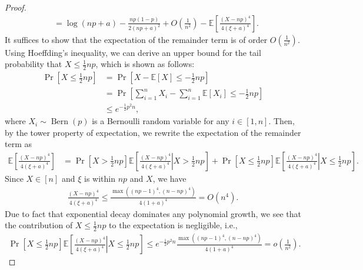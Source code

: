 \documentclass[10pt,a4paper]{amsart}
\DeclareMathOperator{\Bernoulli}{Bern}
\newcommand{\EE}{{\mathbb{E}}}
\begin{document}
\begin{proof}
\begin{equation}
\begin{aligned}
				&= \log (np + a) - \frac{np (1 - p)}{2 (np + a)^2} + O\left( \frac{1}{n^2} \right) - \EE \left[ \frac{(X - np)^4}{4 (\xi + a)^4} \right].
			\end{aligned}
		\end{equation}
		It suffices to show that the expectation of the remainder term is of order $O(\frac{1}{n^2})$. Using Hoeffding's inequality, we can derive an upper bound for the tail probability that $X \leq \frac{1}{2} np$, which is shown as follows:
		\begin{equation}
			\begin{aligned}
				\Pr\left[ X \leq \frac{1}{2} np \right] &= \Pr\left[ X - \EE \left[ X \right] \leq -\frac{1}{2} np \right] \\
				&= \Pr\left[\sum_{i=1}^{n} X_i - \sum_{i=1}^{n} \EE \left[ X_i \right] \leq - \frac{1}{2} np \right] \\
				&\leq e^{-\frac{1}{2} p^2 n},
			\end{aligned}
		\end{equation}
		where $X_i \sim \Bernoulli(p)$ is a Bernoulli random variable for any $i \in [1, n]$. Then, by the tower property of expectation, we rewrite the expectation of the remainder term as
		\begin{equation}
			\begin{aligned}
				\EE \left[ \frac{(X - np)^4}{4 (\xi + a)^4} \right] &= \Pr\left[ X > \frac{1}{2} np \right] \EE \left[ \left. \frac{(X - np)^4}{4 (\xi + a)^4} \right| X > \frac{1}{2}np \right] + \Pr\left[ X \leq \frac{1}{2} np \right] \EE \left[ \left. \frac{(X - np)^4}{4 (\xi + a)^4} \right| X \leq \frac{1}{2}np \right].
			\end{aligned}\label{eq:exp_remainder}
		\end{equation}
		Since $X \in [n]$ and $\xi$ is within $np$ and $X$, we have 
		\begin{equation}
			\begin{aligned}
				\frac{(X - np)^4}{4 (\xi + a)^4} \leq \frac{\max((np-1)^4, (n-np)^4)}{4(1+a)^4} = O(n^4).
			\end{aligned}
		\end{equation}
		Due to fact that exponential decay dominates any polynomial growth, we see that the contribution of $X \leq \frac{1}{2} np$ to the expectation is negligible, i.e.,
		\begin{equation}
			\begin{aligned}
				\Pr\left[ X \leq \frac{1}{2} np \right] \EE \left[ \left. \frac{(X - np)^4}{4 (\xi + a)^4} \right| X \leq \frac{1}{2}np \right] \leq e^{-\frac{1}{2} p^2 n} \frac{\max((np-1)^4, (n-np)^4)}{4(1+a)^4} = o(\frac{1}{n^2}).

\end{aligned}
\end{equation}
\end{proof}
\end{document}
